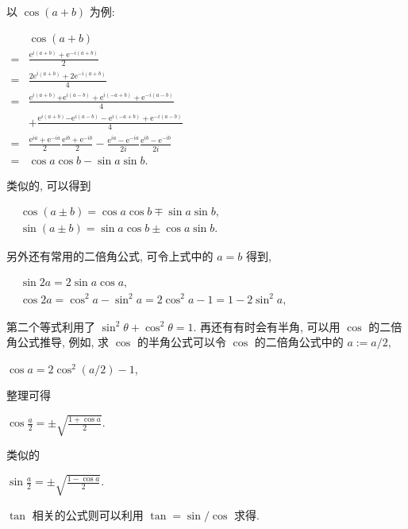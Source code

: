 \begin{tcolorbox}[size=fbox, breakable, enhanced jigsaw, title={利用三角函数的指数形式推导三角函数恒等式}]

以 $\cos (a+b)$ 为例:

$\begin{aligned}&\cos(a+b)\\
=&\frac{\mathrm{e}^{i(a+b)}+\mathrm{e}^{-i(a+b)}}{2}\\
=&\frac{2\mathrm{e}^{i(a+b)}+2\mathrm{e}^{-i(a+b)}}{4}\\
=&\frac{\mathrm{e}^{i(a+b)}{+\mathrm{e}^{i(a-b)}+\mathrm{e}^{i(-a+b)}}+\mathrm{e}^{-i(a-b)}}{4}\\
&+\frac{\mathrm{e}^{i(a+b)}{-\mathrm{e}^{i(a-b)}-\mathrm{e}^{i(-a+b)}}+\mathrm{e}^{-i(a-b)}}{4}\\
=&\frac{\mathrm{e}^{ia}+\mathrm{e}^{-ia}}{2}\frac{\mathrm{e}^{ib}+\mathrm{e}^{-ib}}{2}-\frac{\mathrm{e}^{ia}-\mathrm{e}^{-ia}}{2i}\frac{\mathrm{e}^{ib}-\mathrm{e}^{-ib}}{2i}\\
=&\cos a\cos b-\sin a\sin b.\end{aligned}$

类似的, 可以得到

$\boxed{\begin{aligned}
&\cos(a\pm b)=\cos a\cos b\mp \sin a \sin b,\\
&\sin(a\pm b)=\sin a\cos b\pm \cos a\sin b.    
\end{aligned}}$

另外还有常用的二倍角公式, 可令上式中的 $a=b$ 得到,

$\boxed{\begin{aligned}
&\sin2a=2\sin a\cos a,\\
&\cos2a=\cos^2a-\sin^2a=2\cos^2a-1=1-2\sin^2a,    
\end{aligned}}$

第二个等式利用了 $\sin^2\theta+\cos^2\theta=1$. 再还有有时会有半角,
可以用 $\cos$ 的二倍角公式推导, 例如, 求 $\cos$ 的半角公式可以令
$\cos$ 的二倍角公式中的 $a:=a/2$,

$\cos a=2\cos^2(a/2)-1$,

整理可得

$\boxed{\cos\frac{a}{2}=\pm\sqrt{\frac{1+\cos a}{2}}}.$

类似的

$\boxed{\sin\frac{a}{2}=\pm\sqrt{\frac{1-\cos a}{2}}}.$

$\tan$ 相关的公式则可以利用 $\tan=\sin/\cos$ 求得.

\end{tcolorbox}